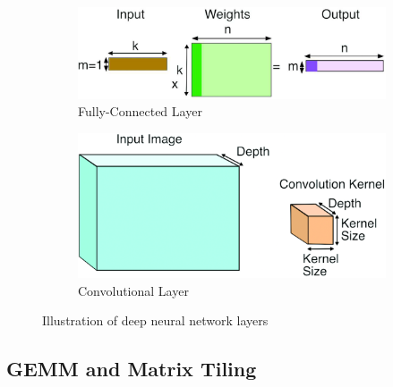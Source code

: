 \begin{figure}[t]
    \centering
    \begin{subfigure}[b]{0.2\textwidth}
    \includegraphics[width=\linewidth]{3_GEMM_backgrounds/fc.png}
    \caption{Fully-Connected Layer}
    \label{fig:fc}
    \end{subfigure}
    \hspace{0.2in}
    \begin{subfigure}[b]{0.2\textwidth}
    \includegraphics[width=\linewidth]{3_GEMM_backgrounds/cnn.png}
    \caption{Convolutional Layer}
    \label{fig:cnn}
    \end{subfigure}
    \caption{Illustration of deep neural network layers}
    \label{fig:layers}
\end{figure}



\subsection{GEMM and Matrix Tiling}

